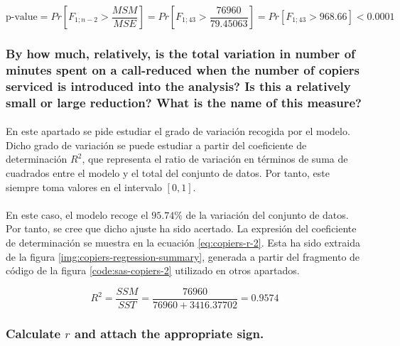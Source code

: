 \documentclass{article}
\begin{document}
        \begin{equation}
        \label{eq:copiers-f-test-p-value}
          \text{p-value} = Pr\left[F_{1;n-2} > \frac{MSM}{MSE}\right] =
          Pr\left[F_{1;43} > \frac{76960}{79.45063}\right] =
          Pr\left[F_{1;43} > 968.66\right] <
          0.0001
        \end{equation}

      \subsubsection{By how much, relatively, is the total variation in number of minutes spent on a call-reduced when the number of copiers serviced is introduced into the analysis? Is this a relatively small or large reduction? What is the name of this measure?}

        \paragraph{}
        En este apartado se pide estudiar el grado de variación recogida por el modelo. Dicho grado de variación se puede estudiar a partir del coeficiente de determinación $R^2$, que representa el ratio de variación en términos de suma de cuadrados entre el modelo y el total del conjunto de datos. Por tanto, este siempre toma valores en el intervalo $[0,1]$.

        \paragraph{}
        En este caso, el modelo recoge el $95.74\%$ de la variación del conjunto de datos. Por tanto, se cree que dicho ajuste ha sido acertado. La expresión del coeficiente de determinación se muestra en la ecuación \eqref{eq:copiers-r-2}. Esta ha sido extraida de la figura \ref{img:copiers-regression-summary}, generada a partir del fragmento de código de la figura \ref{code:sas-copiers-2} utilizado en otros apartados.

        \begin{equation}
        \label{eq:copiers-r-2}
          R^2 = \frac{SSM}{SST} = \frac{76960}{76960 + 3416.37702} = 0.9574
        \end{equation}

      \subsubsection{Calculate $r$ and attach the appropriate sign.}
\end{document}
